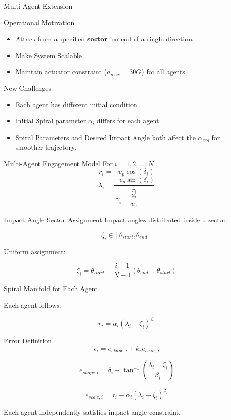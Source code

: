 \begin{frame}{Multi-Agent Extension}
	\begin{block}{Operational Motivation}
		\begin{itemize}
			\item Attack from a specified \textbf{sector} instead of a single direction.
			\item Make System Scalable
			\item Maintain actuator constraint ($a_{max} = 30G$) for all agents.
		\end{itemize}
	\end{block}
	
	\begin{alertblock}{New Challenges}
		\begin{itemize}
			\item Each agent has different initial condition.
			\item Initial Spiral parameter $\alpha_i$ differs for each agent.
			\item Spiral Parameters and Desired Impact Angle both affect the $\alpha_{req}$ for smoother trajectory.  
		\end{itemize}
	\end{alertblock}
\end{frame}
\begin{frame}{Multi-Agent Engagement Model}
	For $i = 1,2,\dots,N$
	\[
	\dot r_i = -v_p \cos(\delta_i)
	\]
	\[
	\dot \lambda_i = \frac{-v_p \sin(\delta_i)}{r_i}
	\]
	\[
	\dot \gamma_i = \frac{a_i}{v_p}
	\]
	
	\begin{block}{Impact Angle Sector Assignment}
		Impact angles distributed inside a sector:
		
		\[
		\zeta_i \in [\theta_{start},\theta_{end}]
		\]
		
		Uniform assignment:
		
		\[
		\zeta_i = \theta_{start} + \frac{i-1}{N-1}
		(\theta_{end}-\theta_{start})
		\]
	\end{block}
	
\end{frame}
\begin{frame}{Spiral Manifold for Each Agent}
	
	Each agent follows:
	
	\[
	r_i = \alpha_i (\lambda_i - \zeta_i)^{\beta_i}
	\]
	
	\begin{block}{Error Definition}
		\[
		e_i = e_{shape,i} + k_r e_{scale,i}
		\]
		
		\[
		e_{shape,i} = \delta_i - \tan^{-1}\left(\frac{\lambda_i - \zeta_i}{\beta_i}\right)
		\]
		
		\[
		e_{scale,i} = r_i - \alpha_i (\lambda_i - \zeta_i)^{\beta_i}
		\]
	\end{block}
	
	Each agent independently satisfies impact angle constraint.
\end{frame}
